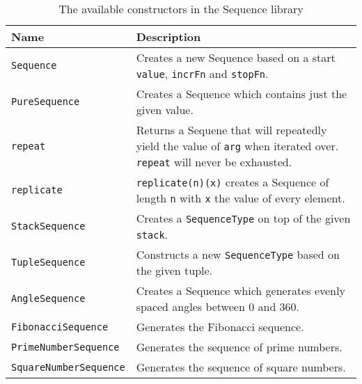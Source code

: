 \begin{table}[H]
  \centering
  \begin{tabularx}{\textwidth}{| l | X |} \hline
    \textbf{Name} & \textbf{Description} \\ \hline
    \texttt{Sequence} & Creates a new Sequence based on a start \texttt{value}, \texttt{incrFn} and \texttt{stopFn}. \\ \hline
    \texttt{PureSequence} & Creates a Sequence which contains just the given value. \\ \hline
    \texttt{repeat} & Returns a Sequene that will repeatedly yield the value of \texttt{arg} when iterated over. \texttt{repeat} will never be exhausted. \\ \hline
    \texttt{replicate} & \texttt{replicate(n)(x)} creates a Sequence of length \texttt{n} with \texttt{x} the value of every element. \\ \hline
    \texttt{StackSequence} & Creates a \texttt{SequenceType} on top of the given \texttt{stack}. \\ \hline
    \texttt{TupleSequence} & Constructs a new \texttt{SequenceType} based on the given tuple. \\ \hline
    \texttt{AngleSequence} & Creates a Sequence which generates evenly spaced angles between 0 and 360. \\ \hline
    \texttt{FibonacciSequence} & Generates the Fibonacci sequence. \\  \hline
    \texttt{PrimeNumberSequence} & Generates the sequence of prime numbers. \\ \hline
    \texttt{SquareNumberSequence} & Generates the sequence of square numbers. \\ \hline
  \end{tabularx}
  \caption{The available constructors in the Sequence library}
  \label{tab:api_ctors}
\end{table}
